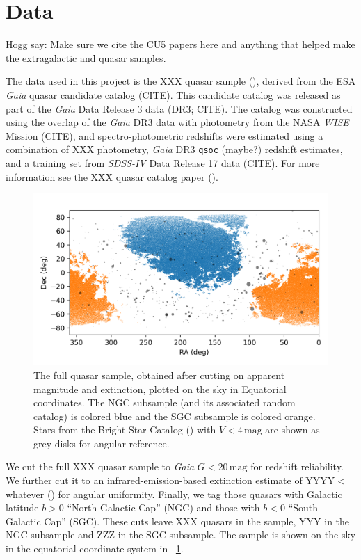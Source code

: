 \documentclass[modern]{aastex631}
\newlength{\figurewidth}
\newcommand{\unit}[1]{\mathrm{#1}}
\newcommand{\mg}{\unit{mag}}
\newcommand{\figref}[1]{\figurename~\ref{#1}}
\begin{document}
\section{Data}

Hogg say: Make sure we cite the CU5 papers here and anything that helped make the extragalactic and quasar samples.

The data used in this project is the XXX quasar sample (\citealt{ksf}), derived from the ESA \textsl{Gaia} quasar candidate catalog (CITE).
This candidate catalog was released as part of the \textsl{Gaia} Data Release 3 data (DR3; CITE).
The catalog was constructed using the overlap of the \textsl{Gaia} DR3 data with photometry from the NASA \textsl{WISE} Mission (CITE), and spectro-photometric redshifts were estimated using a combination of XXX photometry, \textsl{Gaia} DR3 \texttt{qsoc} (maybe?) redshift estimates, and a training set from \textsl{SDSS-IV} Data Release 17 data (CITE).
For more information see the XXX quasar catalog paper (\citealt{ksf}).

\begin{figure}[t!]
  \begin{mdframed}
  \color{captiongray}
  \begin{center}
    \includegraphics[width=\figurewidth]{notebooks/radec.png}
  \end{center}
    \caption{The full quasar sample, obtained after cutting on apparent magnitude and extinction, plotted on the sky in Equatorial coordinates.
    The NGC subsample (and its associated random catalog) is colored blue and the SGC subsample is colored orange.
    Stars from the Bright Star Catalog (\citealt{bsc}) with $V<4\,\mg$ are shown as grey disks for angular reference.\label{fig:radec}}
  \end{mdframed}
\end{figure}
We cut the full XXX quasar sample to \textsl{Gaia} $G<20\,\mg$ for redshift reliability.
We further cut it to an infrared-emission-based extinction estimate of YYYY$<$whatever (\citealt{sfd}) for angular uniformity.
Finally, we tag those quasars with Galactic latitude $b>0$ ``North Galactic Cap'' (NGC) and those with $b<0$ ``South Galactic Cap'' (SGC).
These cuts leave XXX quasars in the sample, YYY in the NGC subsample and ZZZ in the SGC subsample.
The sample is shown on the sky in the equatorial coordinate system in \figref{fig:radec}.
\end{document}

